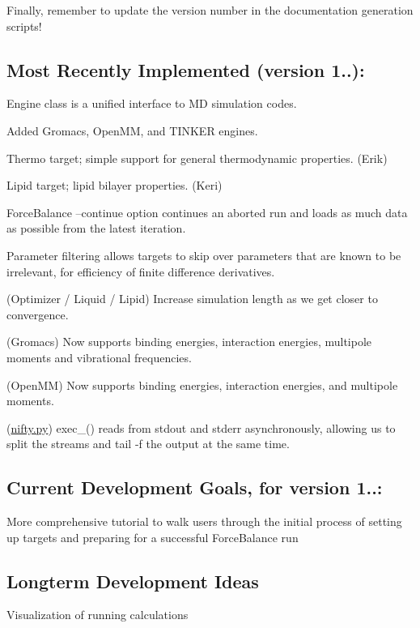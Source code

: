 Finally, remember to update the version number in the documentation generation scripts!\hypertarget{roadmap_recent}{}\subsection{Most Recently Implemented (version 1..)\-:}\label{roadmap_recent}
\begin{DoxyItemize}
\item Engine class is a unified interface to M\-D simulation codes. \item Added Gromacs, Open\-M\-M, and T\-I\-N\-K\-E\-R engines. \item Thermo target; simple support for general thermodynamic properties. (Erik) \item Lipid target; lipid bilayer properties. (Keri) \item Force\-Balance --continue option continues an aborted run and loads as much data as possible from the latest iteration. \item Parameter filtering allows targets to skip over parameters that are known to be irrelevant, for efficiency of finite difference derivatives. \item (Optimizer / Liquid / Lipid) Increase simulation length as we get closer to convergence. \item (Gromacs) Now supports binding energies, interaction energies, multipole moments and vibrational frequencies. \item (Open\-M\-M) Now supports binding energies, interaction energies, and multipole moments. \item (\hyperlink{nifty_8py}{nifty.\-py}) exec\-\_\-() reads from stdout and stderr asynchronously, allowing us to split the streams and tail -\/f the output at the same time.\end{DoxyItemize}
\hypertarget{roadmap_current}{}\subsection{Current Development Goals, for version 1..\-:}\label{roadmap_current}
\begin{DoxyItemize}
\item More comprehensive tutorial to walk users through the initial process of setting up targets and preparing for a successful Force\-Balance run\end{DoxyItemize}
\hypertarget{roadmap_longterm}{}\subsection{Longterm Development Ideas}\label{roadmap_longterm}
\begin{DoxyItemize}
\item Visualization of running calculations \end{DoxyItemize}
